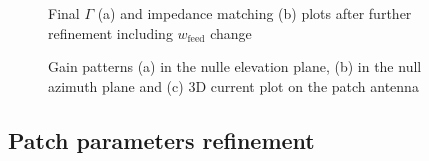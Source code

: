 \documentclass[10 pt,a4paper,twocolumn]{article}
\begin{document}
{\begin{figure}[bt!]
		\begin{subfigure}{0.45\linewidth}
				\def\svgwidth{\linewidth}
			\tiny{}
					\caption{}
		\end{subfigure}
	\hfill
		\begin{subfigure}{0.48\linewidth}
				\def\svgwidth{\linewidth}
			\tiny{}
					\caption{}
		\end{subfigure}
		\caption{Final $\Gamma$ (a) and impedance matching (b) plots after further refinement including $w_{\operatorname{feed}}$ change}
		\label{fig:Gamma and Z}
\end{figure}

\begin{figure}[bt!]
		\begin{subfigure}[b]{0.28\linewidth}
				\def\svgwidth{\linewidth}
			\tiny{}
			\caption{}	\end{subfigure}
		\hfill
		\begin{subfigure}[b]{0.28\linewidth}
					\def\svgwidth{\linewidth}
			\tiny{}
			\caption{}	\end{subfigure}
		\hfill
		\begin{subfigure}[b]{0.34\linewidth}
					\def\svgwidth{\linewidth}
			\tiny{}
			\caption{} \end{subfigure}
		\hfill
		\caption{Gain patterns (a) in the nulle elevation plane, (b) in the null azimuth plane and (c) 3D current plot on the patch antenna }
\end{figure}



\subsection*{Patch parameters refinement}
\begin{figure}[bt!]
	
	\begin{subfigure}[t]{0.32\linewidth}
		\def\svgwidth{\linewidth}
		\tiny{}
		\caption{}
		\label{eq:minG vs mesh}
	\end{subfigure}
	\hfill
	\begin{subfigure}[t]{0.32\linewidth}
		\def\svgwidth{\linewidth}
		\tiny{}
		

\end{subfigure}
\end{figure}}
\end{document}
